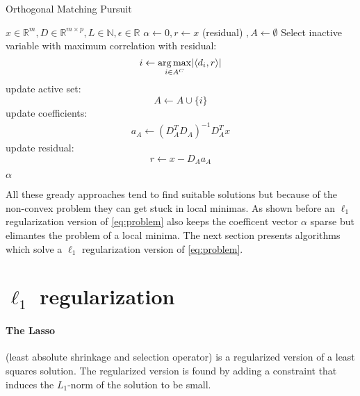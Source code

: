 \begin{algorithm}
\caption{Orthogonal Matching Pursuit}
\label{alg:omp}
\begin{algorithmic}[1]
\REQUIRE $x \in \mathbb{R}^m, D \in \mathbb{R}^{m\times p}, L \in \mathbb{N}, \epsilon \in \mathbb{R}$
\STATE $\alpha \gets 0, r \gets x $ (residual) $, A \gets \emptyset$
\STATE Select inactive variable with maximum correlation with residual: 
\begin{equation*}
i \gets \operatorname*{arg\,max}_{i \in A^C} \lvert \left<d_i,r\right> \rvert
\end{equation*}
\STATE update active set:
\begin{equation*}
 A \gets A \cup \{i\} 
\end{equation*}
\STATE update coefficients: 
\begin{align}
a_A \gets \left( D_A^T D_A \right)^{-1} D_A^T x  \label{eq:omp_update}
\end{align}
\STATE update residual:
\begin{equation*}
 r \gets x-D_Aa_A
\end{equation*}
 

\ENDFOR
\RETURN $\alpha$
\end{algorithmic}
\end{algorithm}


All these gready approaches tend to find suitable solutions but because of the
non-convex problem they can get stuck in local minimas. As shown before an
$\ell_1$ regularization version of \ref{eq:problem} also keeps the coefficent
vector $\alpha$ sparse but elimantes the problem of a local minima. The next
section presents algorithms which solve  a $\ell_1$ regularization version of
\ref{eq:problem}.



\section {$\ell_1$ regularization}



\paragraph{The Lasso} (least absolute shrinkage and selection operator) is a
regularized version of a least squares solution. The regularized version is
found by adding a constraint that induces the $L_1$-norm of the solution to be
small.\cite{Tibshirani1996}

